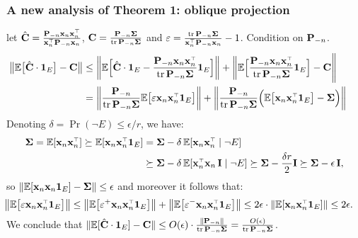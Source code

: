 \documentclass[10pt]{beamer}
\begin{document}
  \begin{frame}
    \frametitle{A new analysis of Theorem 1: oblique projection}
let $\hat\C=\frac{\P_{-n}\x_n\x_n^\top}{\x_n^\top\P_{-n}\x_n}$, $\C=\frac{\P_{-n}\Sigmab}{\tr\,\P_{-n}\Sigmab}$ and
$\varepsilon=\frac{\tr\,\P_{-n}\Sigmab}{\x_n^\top\P_{-n}\x_n}-1$.
Condition on $\P_{-n}$. 
    \begin{align*}
\hspace{-5mm}\big\|\E\big[\hat\C \cdot \one _E\big]-\C\big\|
&\leq\bigg\|\E\Big[\hat\C \cdot \one _E -
\frac{\P_{-n}\x_n\x_n^\top}{\tr\,\P_{-n}\Sigmab} \one _E\Big]\bigg\|
        + \bigg\|\E\Big[\frac{\P_{-n}\x_n\x_n^\top}{\tr\,\P_{-n}\Sigmab} \one_E\Big]
-\C\Bigg\|\\ 
      &=\bigg\|\frac{\P_{-n}}{\tr\,\P_{-n}\Sigmab}
        \E\big[\varepsilon\x_n\x_n^\top\one_E\big]\bigg\|
        +\bigg\|\frac{\P_{-n}}{\tr\,\P_{-n}\Sigmab}\Big(\E\big[\x_n\x_n^\top\one_E\big]-\Sigmab\Big)\bigg\|
    \end{align*}
Denoting $\delta = \Pr(\neg E)\leq \epsilon/r$, we have:
\begin{align*}
\Sigmab = \E[\x_n\x_n^\top] \succeq  \E[\x_n\x_n^\top\one_E]
  &= \Sigmab - \delta\,\E[\x_n\x_n^\top\mid\neg E]\\
  &\succeq \Sigmab - \delta\,
    \E[\x_n^\top\x_n\,\I\mid\neg E]
    \succeq \Sigmab  - \frac{\delta r}{2}\I\succeq \Sigmab - \epsilon\,\I,
\end{align*}
so $\|\E[\x_n\x_n\one_E]-\Sigmab\|\leq \epsilon$ and moreover it
follows that:
    \begin{align*}
      \hspace{-4mm}
      \big\|\E\big[\varepsilon\x_n\x_n^\top\one_E\big]\big\| \leq
      \big\|\E\big[\varepsilon^+\x_n\x_n^\top\one_E\big]\big\|+
      \big\|\E\big[\varepsilon^-\x_n\x_n^\top\one_E\big]\big\|\leq
      2\epsilon\cdot \|\E[\x_n\x_n^\top\one_E]\|\leq 2\epsilon.
    \end{align*}
We conclude that $\|\E[\hat\C\cdot\one_E]-\C\|\leq O(\epsilon)\cdot
\frac{\|\P_{-n}\|}{\tr\,\P_{-n}\Sigmab}=\frac{O(\epsilon)}{\tr\,\P_{-n}\Sigmab}$. 
  \end{frame}
\end{document}
